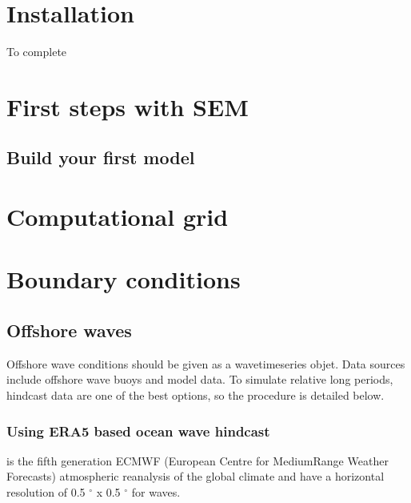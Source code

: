 \documentclass[letterpaper,10pt,english]{sphinxmanual}
\begin{document}
\chapter{Installation}
\label{\detokenize{docs/installing:installation}}\label{\detokenize{docs/installing::doc}}
To complete


\chapter{First steps with SEM}
\label{\detokenize{docs/first-steps:first-steps-with-sem}}\label{\detokenize{docs/first-steps::doc}}

\section{Build your first model}
\label{\detokenize{docs/first-steps:build-your-first-model}}

\chapter{Computational grid}
\label{\detokenize{docs/computational-grid:computational-grid}}\label{\detokenize{docs/computational-grid::doc}}

\chapter{Boundary conditions}
\label{\detokenize{docs/boundary-conditions:boundary-conditions}}\label{\detokenize{docs/boundary-conditions::doc}}

\section{Offshore waves}
\label{\detokenize{docs/boundary-conditions:offshore-waves}}
Offshore wave conditions should be given as a wavetimeseries objet. Data sources include offshore wave buoys and model data. To simulate relative long periods, hindcast data are one of the best options, so the procedure is detailed below.


\subsection{Using ERA5 based ocean wave hindcast}
\label{\detokenize{docs/boundary-conditions:using-era5-based-ocean-wave-hindcast}}
 is the fifth generation ECMWF (European Centre for Medium\sphinxhyphen{}Range Weather Forecasts) atmospheric reanalysis of the global climate and have a horizontal resolution of 0.5 \(^{\circ}\) x 0.5 \(^{\circ}\) for waves.
\end{document}
